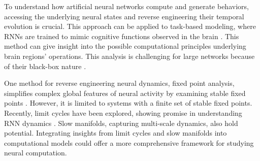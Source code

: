 \documentclass[12pt,letterpaper, onecolumn]{article}
\theoremstyle{definition}
\theoremstyle{remark}
\begin{document}
To understand how artificial neural networks compute and generate behaviors, accessing the underlying neural states and reverse engineering their temporal evolution is crucial. This approach can be applied to task-based modeling, where RNNs are trained to mimic cognitive functions observed in the brain \citep{darshan2022, barak2017recurrent}. This method can give insight into the possible computational principles underlying brain regions' operations. This analysis is challenging for large networks because of their black-box nature \citep{lipton2018, erasmus2021}.


One method for reverse engineering neural dynamics, fixed point analysis, simplifies complex global features of neural activity by examining stable fixed points \citep{sussillo2013blackbox, sussillo2014, beer2018, maheswaranathan2019universality, driscoll2022}. However, it is limited to systems with a finite set of stable fixed points. Recently, limit cycles have been explored, showing promise in understanding RNN dynamics \citep{pals2024}. Slow manifolds, capturing multi-scale dynamics, also hold potential. Integrating insights from limit cycles and slow manifolds into computational models could offer a more comprehensive framework for studying neural computation.
\end{document}
